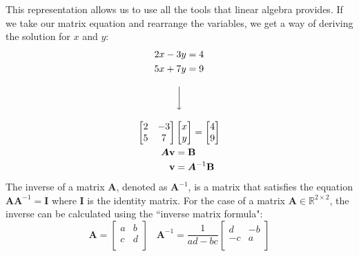 \documentclass[a4paper,12pt]{book}
\newcommand{\matrx}[1]{\bm{#1}}
\newcommand{\vectr}[1]{\textbf{#1}}
\newcommand{\real}{\mathbb{R}}
\begin{document}
	This representation allows us to use all the tools that linear algebra provides. If we take our matrix equation and rearrange the variables, we get a way of deriving the solution for $ x $ and $ y $:
	\begin{equation}
		\begin{array}{c}
			\begin{aligned}
				2x - 3y &= 4 \\
				5x + 7y &= 9
			\end{aligned}
			\\ \\
			\bigg\downarrow\vcenter{ }
			\\ \\
			\begin{aligned}
				\begin{bmatrix}
					2 & -3 \\
					5 & 7 
				\end{bmatrix}&
				\begin{bmatrix}
					x \\
					y
				\end{bmatrix}
				=
				\begin{bmatrix}
					4 \\
					9
				\end{bmatrix} \\
			\matrx{A} \vectr{v} &= \vectr{B} \\
			\vectr{v} &= \matrx{A}^{-1} \vectr{B}
			\end{aligned}
		\end{array}
	\end{equation}
	The inverse of a matrix $ \matrx{A} $, denoted as $ \matrx{A}^{-1} $, is a matrix that satisfies the equation $ \matrx{A} \matrx{A}^{-1} = \matrx{I} $ where $ \matrx{I} $ is the identity matrix. For the case of a matrix $ \matrx{A} \in \real^{2 \times 2} $, the inverse can be calculated using the ``inverse matrix formula": 
	\begin{equation}
		\matrx{A} = \begin{bmatrix}
			a & b \\
			c & d \\
		\end{bmatrix}
		\hspace{10pt}
		\matrx{A}^{-1} = \frac{1}{ad-bc} \begin{bmatrix}
			d & -b \\
			-c & a \\
		\end{bmatrix}
		\label{eq:2_2_inv}
	\end{equation}
\end{document}
